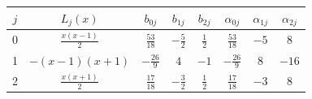 \begin{tabular}{c|c|ccc|ccc}
$j$ & $L_j(x)$ & $b_{0j}$ & $b_{1j}$ & $b_{2j}$ & $\alpha_{0j}$ & $\alpha_{1j}$ & $\alpha_{2j}$ \\ \hline
0 & $\frac{x \left(x - 1\right)}{2}$ & $\frac{53}{18}$ & $- \frac{5}{2}$ & $\frac{1}{2}$ & $\frac{53}{18}$ & $-5$ & $8$ \\
1 & $- \left(x - 1\right) \left(x + 1\right)$ & $- \frac{26}{9}$ & $4$ & $-1$ & $- \frac{26}{9}$ & $8$ & $-16$ \\
2 & $\frac{x \left(x + 1\right)}{2}$ & $\frac{17}{18}$ & $- \frac{3}{2}$ & $\frac{1}{2}$ & $\frac{17}{18}$ & $-3$ & $8$ \\
\end{tabular}
